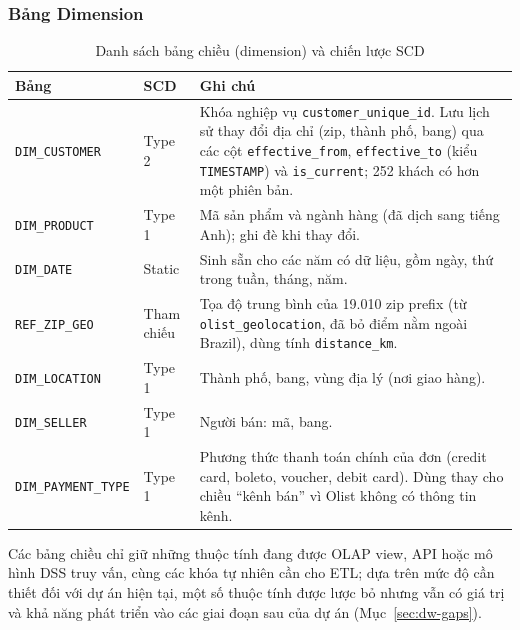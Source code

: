 \subsubsection{Bảng Dimension}
\begin{table}[H]
\centering
\caption{Danh sách bảng chiều (dimension) và chiến lược SCD}
\begin{tabular}{@{}p{4cm}p{2cm}p{10cm}@{}}
\toprule
\textbf{Bảng} & \textbf{SCD} & \textbf{Ghi chú} \\
\midrule
\texttt{DIM\_CUSTOMER} & Type 2 & Khóa nghiệp vụ \texttt{customer\_unique\_id}. Lưu lịch sử
thay đổi địa chỉ (zip, thành phố, bang) qua các cột \texttt{effective\_from},
\texttt{effective\_to} (kiểu \texttt{TIMESTAMP}) và \texttt{is\_current}; 252 khách có hơn
một phiên bản. \\
\texttt{DIM\_PRODUCT} & Type 1 & Mã sản phẩm và ngành hàng (đã dịch sang tiếng Anh); ghi đè
khi thay đổi. \\
\texttt{DIM\_DATE} & Static & Sinh sẵn cho các năm có dữ liệu, gồm ngày, thứ trong tuần, tháng,
năm. \\
\texttt{REF\_ZIP\_GEO} & Tham chiếu & Tọa độ trung bình của 19.010 zip prefix (từ
\texttt{olist\_geolocation}, đã bỏ điểm nằm ngoài Brazil), dùng tính \texttt{distance\_km}. \\
\texttt{DIM\_LOCATION} & Type 1 & Thành phố, bang, vùng địa lý (nơi giao hàng). \\
\texttt{DIM\_SELLER} & Type 1 & Người bán: mã, bang. \\
\texttt{DIM\_PAYMENT\_\allowbreak TYPE} & Type 1 & Phương thức thanh toán chính của đơn (credit card,
boleto, voucher, debit card). Dùng thay cho chiều ``kênh bán'' vì Olist không có thông tin
kênh. \\
\bottomrule
\end{tabular}
\end{table}

Các bảng chiều chỉ giữ những thuộc tính đang được OLAP view, API hoặc mô hình DSS truy vấn,
cùng các khóa tự nhiên cần cho ETL; dựa trên mức độ cần thiết đối với dự án hiện tại, một số thuộc tính được lược bỏ 
nhưng vẫn có giá trị và khả năng phát triển vào các giai đoạn sau của dự án (Mục~\ref{sec:dw-gaps}).


